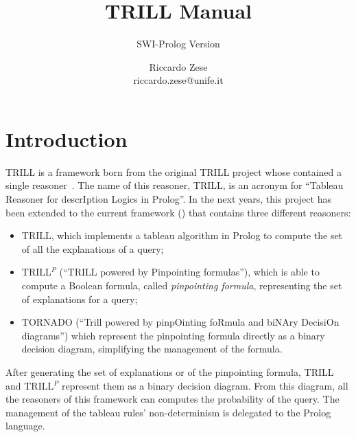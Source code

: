 \documentclass[a4paper,10pt]{scrartcl}
\begin{document}
\title{TRILL Manual}

\subtitle{SWI-Prolog Version}

\author{Riccardo Zese\\
riccardo.zese@unife.it}

\maketitle


\section{Introduction}


TRILL is a framework born from the original TRILL project whose contained a single reasoner~\cite{ZesBelLamRig13-CILC13-NC}. The name of this reasoner, TRILL, is an acronym for ``Tableau Reasoner for descrIption Logics in Prolog''. In the next years, this project has been extended to the current framework (\cite{ZesBelRig16-AMAI-IJ,Zese17-SSW-BK,ZesBelCot19-TPLP-IJ}) that contains three different reasoners:
\begin{itemize}
	\item TRILL, which implements a tableau algorithm in Prolog to compute the set of all the explanations of a query;
	\item TRILL$^P$ (``TRILL powered by Pinpointing formulas''), which is able to compute a Boolean formula, called \emph{pinpointing formula}, representing the set of explanations for a query;
	\item TORNADO (``Trill powered by pinpOinting foRmula and biNAry DecisiOn diagrams'') which represent the pinpointing formula directly as a binary decision diagram, simplifying the management of the formula.
\end{itemize}  

After generating the set of explanations  or of the pinpointing formula, 
TRILL and  TRILL$^P$ represent them as a binary decision diagram. From this diagram, all the reasoners of this framework can computes the probability of the query. The management of the tableau rules' non-determinism is delegated to the Prolog language.
\end{document}
